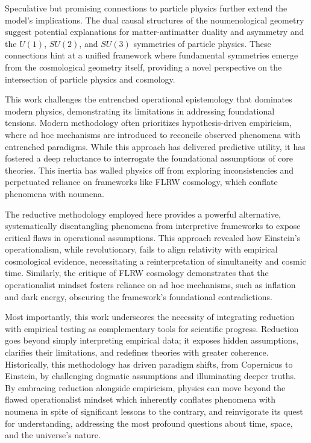 \documentclass[aps,rmp,groupedaddress,twocolumn,10pt]{revtex4-2}
\begin{document}
Speculative but promising connections to particle physics further extend the model's implications. The dual causal structures of the noumenological geometry suggest potential explanations for matter-antimatter duality and asymmetry and the $U(1)$, $SU(2)$, and $SU(3)$ symmetries of particle physics. These connections hint at a unified framework where fundamental symmetries emerge from the cosmological geometry itself, providing a novel perspective on the intersection of particle physics and cosmology.

This work challenges the entrenched operational epistemology that dominates modern physics, demonstrating its limitations in addressing foundational tensions. Modern methodology often prioritizes hypothesis-driven empiricism, where ad hoc mechanisms are introduced to reconcile observed phenomena with entrenched paradigms. While this approach has delivered predictive utility, it has fostered a deep reluctance to interrogate the foundational assumptions of core theories. This inertia has walled physics off from exploring inconsistencies and perpetuated reliance on frameworks like FLRW cosmology, which conflate phenomena with noumena.

The reductive methodology employed here provides a powerful alternative, systematically disentangling phenomena from interpretive frameworks to expose critical flaws in operational assumptions. This approach revealed how Einstein's operationalism, while revolutionary, fails to align relativity with empirical cosmological evidence, necessitating a reinterpretation of simultaneity and cosmic time. Similarly, the critique of FLRW cosmology demonstrates that the operationalist mindset fosters reliance on ad hoc mechanisms, such as inflation and dark energy, obscuring the framework's foundational contradictions.

Most importantly, this work underscores the necessity of integrating reduction with empirical testing as complementary tools for scientific progress. Reduction goes beyond simply interpreting empirical data; it exposes hidden assumptions, clarifies their limitations, and redefines theories with greater coherence. Historically, this methodology has driven paradigm shifts, from Copernicus to Einstein, by challenging dogmatic assumptions and illuminating deeper truths. By embracing reduction alongside empiricism, physics can move beyond the flawed operationalist mindset which inherently conflates phenomena with noumena in spite of significant lessons to the contrary, and reinvigorate its quest for understanding, addressing the most profound questions about time, space, and the universe's nature.
\end{document}
